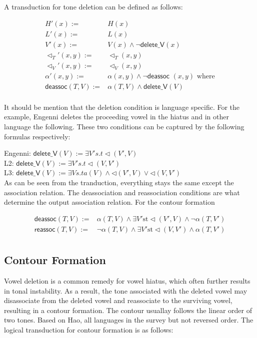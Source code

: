 \documentclass{article}
\begin{document}
A transduction for tone deletion can be defined as follows:

\begin{align*}
	H'(x) := & H(x)\\
	L'(x) := & L(x)\\
	V'(x) := & V(x) \land \neg \textsf{delete\_V} (x)\\
	\lhd_T'(x,y) := & \lhd_T(x,y) \\
	\lhd_V'(x,y) := & \lhd_V(x,y) \\
	\alpha'(x,y) := & \alpha(x,y) \land \neg \textsf{deassoc }(x,y) \text{ where}\\
	\textsf{deassoc}(T,V) := & \alpha(T,V) \land \textsf{delete\_V}(V) \\
\end{align*}

It should be mention that the deletion condition is language specific. For
the example, Engenni deletes the proceeding vowel in the hiatus and in other 
language the following. These two conditions can be captured by the following formulas respectively:

Engenni: $\textsf{delete\_V}(V) := \exists V' s.t \lhd(V',V) $\\
L2: $\textsf{delete\_V}(V) := \exists V' s.t \lhd(V,V') $\\
L3: $\textsf{delete\_V}(V) := \exists V s.t a(V) \land \lhd(V',V) \lor \lhd(V,V')$\\


As can be seen from the tranduction, everything stays the same except the 
association relation. The deassociation and reassociation conditions are 
what determine the output association relation. For the contour formation

\begin{align*}
	\textsf{deassoc}(T,V) := & \alpha (T,V) \land  \exists V' \text{st} \lhd(V',V) \land \neg \alpha (T,V') \\
	\textsf{reassoc}(T,V) := & \neg \alpha (T,V) \land  \exists V' \text{st} \lhd(V,V') \land \alpha (T,V') \\
\end{align*}

\subsection{Contour Formation}
Vowel deletion is a common remedy for vowel hiatus, which often further
results in tonal instability. As a result, the tone associated with the deleted 
vowel may disassociate from the deleted vowel and reassociate to the surviving 
vowel, resulting in a contour formation. The contour usuallay follows the linear
order of two tones. Based on Hao, all languages in the survey but not reversed 
order. The logical transduction for contour formation is as follows:
\end{document}

